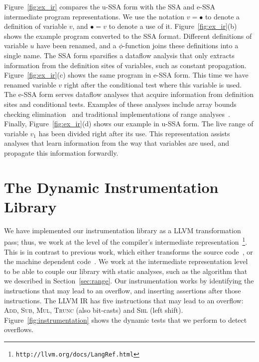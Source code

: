 \documentclass{sigplanconf}[10pt]
\begin{document}
Figure~\ref{fig:ex_ir} compares the u-SSA form with the SSA and e-SSA
intermediate program representations.
We use the notation $v = \bullet$ to denote a definition of variable $v$, and
$\bullet = v$ to denote a use of it.
Figure~\ref{fig:ex_ir}(b) shows the example program converted to the SSA format.
Different definitions of variable $u$ have been renamed, and a
$\phi$-function joins these definitions into a single name.
The SSA form sparsifies a dataflow analysis that only extracts information from
the definition sites of variables, such as constant propagation.
Figure~\ref{fig:ex_ir}(c) shows the same program in e-SSA form.
This time we have renamed variable $v$ right after the conditional test where
this variable is used.
The e-SSA form serves dataflow analyses that acquire information from definition
sites and conditional tests.
Examples of these analyses include array bounds checking
elimination~\cite{Bodik00} and traditional implementations of range
analyses~\cite{Gough94,Patterson95}.
Finally, Figure~\ref{fig:ex_ir}(d) shows our example in u-SSA form.
The live range of variable $v_1$ has been divided right after its use.
This representation assists analyses that learn information from the way
that variables are used, and propagate this information forwardly.

\section{The Dynamic Instrumentation Library}
\label{sec:dyn}

We have implemented our instrumentation library as a LLVM transformation pass;
thus, we work at the level of the compiler's intermediate
representation~\footnote{\texttt{http://llvm.org/docs/LangRef.html}}.
This is in contrast to previous work, which either transforms the
source code~\cite{Dietz12}, or the machine dependent code~\cite{Brumley07}.
We work at the intermediate representation level to be able to couple our
library with static analyses, such as the algorithm that we described in
Section~\ref{sec:range}.
Our instrumentation works by identifying the instructions that may 
lead to an overflow, and inserting assertions after those instructions. 
The LLVM IR has five instructions that may lead to an overflow:
\textsc{Add}, \textsc{Sub}, \textsc{Mul},  \textsc{Trunc} (also bit-casts) and
\textsc{Shl} (left shift).
Figure~\ref{fig:instrumentation} shows the dynamic tests that we perform to
detect overflows.
\end{document}
